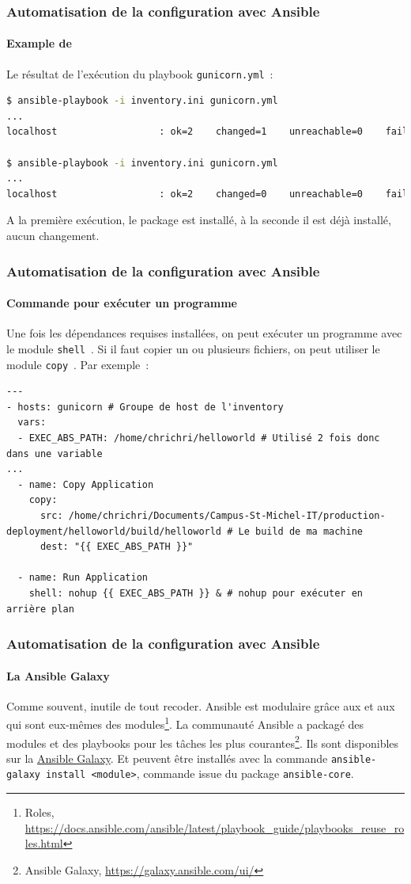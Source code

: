 \documentclass{beamer}
\begin{document}
    \begin{frame}[fragile]
        \transdissolve
        \frametitle{Automatisation de la configuration avec Ansible}
        \framesubtitle{Example de }
        Le résultat de l'exécution du playbook \lstinline{gunicorn.yml}~:
        \begin{lstlisting}[language=bash]
$ ansible-playbook -i inventory.ini gunicorn.yml
...
localhost                  : ok=2    changed=1    unreachable=0    failed=0    skipped=0    rescued=0    ignored=0

$ ansible-playbook -i inventory.ini gunicorn.yml
...
localhost                  : ok=2    changed=0    unreachable=0    failed=0    skipped=0    rescued=0    ignored=0
        \end{lstlisting}
        A la première exécution, le package est installé, à la seconde il est déjà installé, aucun changement.
    \end{frame}

    \begin{frame}[fragile]
        \transdissolve
        \frametitle{Automatisation de la configuration avec Ansible}
        \framesubtitle{Commande pour exécuter un programme}
        Une fois les dépendances requises installées, on peut exécuter un programme avec le module \lstinline{shell}~.
        \bigbreak
        Si il faut copier un ou plusieurs fichiers, on peut utiliser le module \lstinline{copy}~.
        \bigbreak
        Par exemple~:
        \begin{lstlisting}
---
- hosts: gunicorn # Groupe de host de l'inventory
  vars:
  - EXEC_ABS_PATH: /home/chrichri/helloworld # Utilisé 2 fois donc dans une variable
...
  - name: Copy Application
    copy:
      src: /home/chrichri/Documents/Campus-St-Michel-IT/production-deployment/helloworld/build/helloworld # Le build de ma machine
      dest: "{{ EXEC_ABS_PATH }}"

  - name: Run Application
    shell: nohup {{ EXEC_ABS_PATH }} & # nohup pour exécuter en arrière plan
        \end{lstlisting}
    \end{frame}

    \begin{frame}
        \transdissolve
        \frametitle{Automatisation de la configuration avec Ansible}
        \framesubtitle{La Ansible Galaxy}
        Comme souvent, inutile de tout recoder.
        Ansible est modulaire grâce aux  et aux  qui sont eux-mêmes des modules\footnote{Roles, \url{https://docs.ansible.com/ansible/latest/playbook_guide/playbooks_reuse_roles.html}}.
        \bigbreak
        La communauté Ansible a packagé des modules et des playbooks pour les tâches les plus courantes\footnote{Ansible Galaxy, \url{https://galaxy.ansible.com/ui/}}.
        Ils sont disponibles sur la \href{https://galaxy.ansible.com/}{Ansible Galaxy}.
        Et peuvent être installés avec la commande \lstinline{ansible-galaxy install <module>}, commande issue du package \lstinline{ansible-core}.
    \end{frame}
\end{document}
